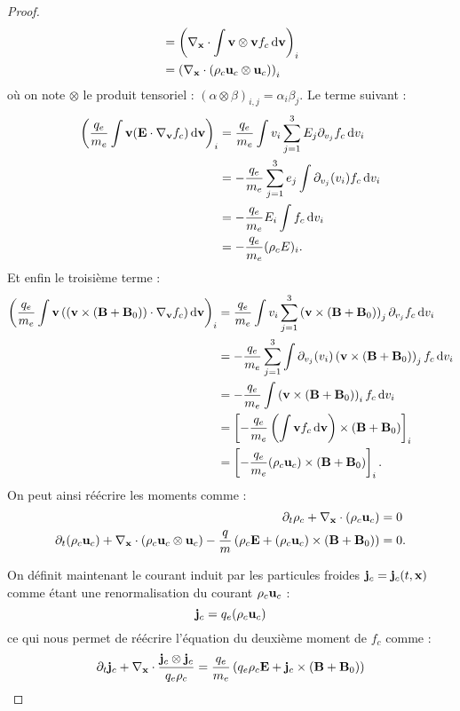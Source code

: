 \begin{proof}
$$\begin{aligned}
          &= \left( \nabla_{\vb{x}}\cdot\int \vb{v}\otimes\vb{v} f_c\dd{\vb{v}} \right)_i \\
          &= \left( \nabla_{\vb{x}}\cdot(\rho_c\vb{u}_c\otimes\vb{u}_c) \right)_i
    \end{aligned}
  $$
  où on note $\otimes$ le produit tensoriel : $(\alpha\otimes\beta)_{i,j} = \alpha_i\beta_j$. Le terme suivant :
  $$
    \begin{aligned}
      \left( \frac{q_e}{m_e}\int\vb{v}(\vb{E}\cdot\nabla_{\vb{v}}f_c)\dd{\vb{v}} \right)_i
          &= \frac{q_e}{m_e}\int v_i\sum_{j=1}^3 E_j\partial_{v_j}f_c\dd{v_i} \\
          &= -\frac{q_e}{m_e}\sum_{j=1}^3 e_j\int\partial_{v_j}(v_i)f_c\dd{v_i} \\
          &= -\frac{q_e}{m_e}E_i\int f_c\dd{v_i} \\
          &= -\frac{q_e}{m_e}(\rho_c E)_i.
    \end{aligned}
  $$
  Et enfin le troisième terme :
  $$
    \begin{aligned}
      \left( \frac{q_e}{m_e}\int\vb{v}\left((\vb{v}\times(\vb{B}+\vb{B}_0))\cdot\nabla_{\vb{v}}f_c\right)\dd{\vb{v}} \right)_i
          &= \frac{q_e}{m_e}\int v_i\sum_{j=1}^3\left(\vb{v}\times(\vb{B}+\vb{B}_0)\right)_j\partial_{v_j}f_c\dd{v_i} \\
          &= -\frac{q_e}{m_e}\sum_{j=1}^3\int\partial_{v_j}(v_i)\left(\vb{v}\times(\vb{B}+\vb{B}_0)\right)_jf_c\dd{v_i} \\
          &= -\frac{q_e}{m_e}\int\left(\vb{v}\times(\vb{B}+\vb{B}_0)\right)_i f_c\dd{v_i} \\
          &= \left[ -\frac{q_e}{m_e}\left(\int\vb{v}f_c\dd{\vb{v}}\right)\times(\vb{B}+\vb{B}_0) \right]_i \\
          &= \left[ -\frac{q_e}{m_e}(\rho_c\vb{u}_c)\times(\vb{B}+\vb{B}_0) \right]_i.
    \end{aligned}
  $$
  On peut ainsi réécrire les moments comme :
  $$
    \begin{aligned}
      \partial_t\rho_c + \nabla_{\vb{x}}\cdot(\rho_c\vb{u}_c) &= 0 \\
      \partial_t(\rho_c\vb{u}_c) + \nabla_{\vb{x}}\cdot(\rho_c\vb{u}_c\otimes\vb{u}_c) - \frac{q}{m}\left( \rho_c\vb{E} + (\rho_c\vb{u}_c)\times(\vb{B}+\vb{B}_0) \right) &=0.
    \end{aligned}
  $$

  On définit maintenant le courant induit par les particules froides $\vb{j}_c=\vb{j}_c(t,\vb{x})$ comme étant une renormalisation du courant $\rho_c\vb{u}_c$ :
  $$
    \vb{j}_c = q_e(\rho_c\vb{u}_c)
  $$
  ce qui nous permet de réécrire l'équation du deuxième moment de $f_c$ comme :
  $$
    \partial_t\vb{j}_c + \nabla_{\vb{x}}\cdot\frac{\vb{j}_c\otimes\vb{j}_c}{q_e\rho_c} = \frac{q_e}{m_e}\left( q_e\rho_c\vb{E} + \vb{j}_c\times(\vb{B}+\vb{B}_0) \right)
  $$


\end{proof}
